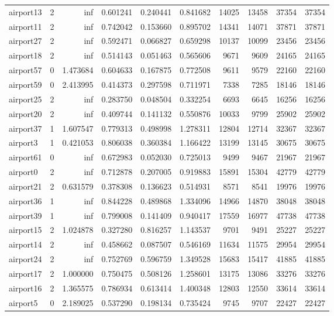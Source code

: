 \begin{longtable}{|l|r|r|r|r|r|r|r|r|r|}
airport13 & 2 & inf & 0.601241 & 0.240441 & 0.841682 & 14025 & 13458 & 37354 & 37354 \\
airport11 & 2 & inf & 0.742042 & 0.153660 & 0.895702 & 14341 & 14071 & 37871 & 37871 \\
airport27 & 2 & inf & 0.592471 & 0.066827 & 0.659298 & 10137 & 10099 & 23456 & 23456 \\
airport18 & 2 & inf & 0.514143 & 0.051463 & 0.565606 & 9671 & 9609 & 24165 & 24165 \\
airport57 & 0 & 1.473684 & 0.604633 & 0.167875 & 0.772508 & 9611 & 9579 & 22160 & 22160 \\
airport59 & 0 & 2.413995 & 0.414373 & 0.297598 & 0.711971 & 7338 & 7285 & 18146 & 18146 \\
airport25 & 2 & inf & 0.283750 & 0.048504 & 0.332254 & 6693 & 6645 & 16256 & 16256 \\
airport20 & 2 & inf & 0.409744 & 0.141132 & 0.550876 & 10033 & 9799 & 25902 & 25902 \\
airport37 & 1 & 1.607547 & 0.779313 & 0.498998 & 1.278311 & 12804 & 12714 & 32367 & 32367 \\
airport3 & 1 & 0.421053 & 0.806038 & 0.360384 & 1.166422 & 13199 & 13145 & 30675 & 30675 \\
airport61 & 0 & inf & 0.672983 & 0.052030 & 0.725013 & 9499 & 9467 & 21967 & 21967 \\
airport0 & 2 & inf & 0.712878 & 0.207005 & 0.919883 & 15891 & 15304 & 42779 & 42779 \\
airport21 & 2 & 0.631579 & 0.378308 & 0.136623 & 0.514931 & 8571 & 8541 & 19976 & 19976 \\
airport36 & 1 & inf & 0.844228 & 0.489868 & 1.334096 & 14966 & 14870 & 38048 & 38048 \\
airport39 & 1 & inf & 0.799008 & 0.141409 & 0.940417 & 17559 & 16977 & 47738 & 47738 \\
airport15 & 2 & 1.024878 & 0.327280 & 0.816257 & 1.143537 & 9701 & 9491 & 25227 & 25227 \\
airport14 & 2 & inf & 0.458662 & 0.087507 & 0.546169 & 11634 & 11575 & 29954 & 29954 \\
airport24 & 2 & inf & 0.752769 & 0.596759 & 1.349528 & 15683 & 15417 & 41885 & 41885 \\
airport17 & 2 & 1.000000 & 0.750475 & 0.508126 & 1.258601 & 13175 & 13086 & 33276 & 33276 \\
airport16 & 2 & 1.365575 & 0.786934 & 0.613414 & 1.400348 & 12803 & 12550 & 33614 & 33614 \\
airport5 & 0 & 2.189025 & 0.537290 & 0.198134 & 0.735424 & 9745 & 9707 & 22427 & 22427 \\

\end{longtable}
